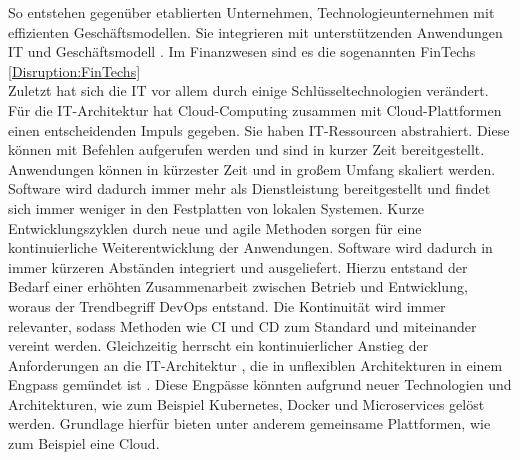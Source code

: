 So entstehen gegenüber etablierten Unternehmen, Technologieunternehmen mit effizienten Geschäftsmodellen. Sie integrieren mit unterstützenden Anwendungen IT und Geschäftsmodell \cite{Bussmann2006}. Im Finanzwesen sind es die sogenannten FinTechs \ref{Disruption:FinTechs}
\medskip
\\
Zuletzt hat sich die IT vor allem durch einige Schlüsseltechnologien verändert. Für die IT-Architektur hat Cloud-Computing zusammen mit Cloud-Plattformen einen entscheidenden Impuls gegeben. Sie haben IT-Ressourcen abstrahiert. Diese können mit Befehlen aufgerufen werden und sind in kurzer Zeit bereitgestellt. Anwendungen können in kürzester Zeit und in großem Umfang skaliert werden. Software wird dadurch immer mehr als Dienstleistung bereitgestellt und findet sich immer weniger in den Festplatten von lokalen Systemen. Kurze Entwicklungszyklen durch neue und agile Methoden sorgen für eine kontinuierliche Weiterentwicklung der Anwendungen. Software wird dadurch in immer kürzeren Abständen integriert und ausgeliefert. Hierzu entstand der Bedarf einer erhöhten Zusammenarbeit zwischen Betrieb und Entwicklung, woraus der Trendbegriff DevOps entstand. Die Kontinuität wird immer relevanter, sodass Methoden wie \ac{CI} und \ac{CD} zum Standard und miteinander vereint werden. Gleichzeitig herrscht ein kontinuierlicher Anstieg der Anforderungen an die IT-Architektur \cite{Bussmann2006}, die in unflexiblen Architekturen in einem Engpass gemündet ist \cite{Brockhoff2006, Bussmann2006}. Diese Engpässe könnten aufgrund neuer Technologien und Architekturen, wie zum Beispiel Kubernetes, Docker und Microservices gelöst werden. Grundlage hierfür bieten unter anderem gemeinsame Plattformen, wie zum Beispiel eine Cloud.


